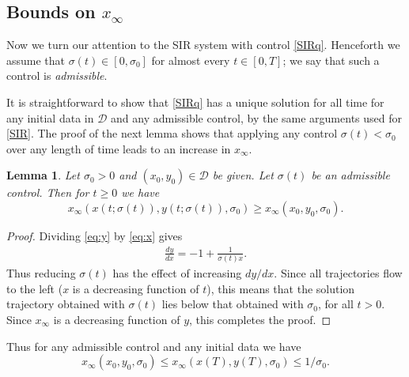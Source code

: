 \documentclass[english,12pt,letter]{article}
\newtheorem{lem}{Lemma}
\newtheorem{dfn}{Definition}
\newcommand{\Rnot}{\sigma_0}
\newcommand{\Sinf}{x_\infty}
\newcommand{\dom}{{\mathcal D}}
\begin{document}
\subsection{Bounds on $\Sinf$}
Now we turn our attention to the SIR system with control \eqref{SIRq}.
Henceforth we assume that $\sigma(t)\in[0,\sigma_0]$ for almost every $t\in[0,T]$;
we say that such a control is \emph{admissible}.


It is straightforward to show that \eqref{SIRq} has a unique solution for all time
for any initial data in $\dom$ and any admissible control, by the same
arguments used for \eqref{SIR}.
The proof of the next lemma shows that applying any control $\sigma(t)<\Rnot$ over
any length of time leads to an increase in $x_\infty$.
\begin{lem}
Let $\Rnot>0$ and $(x_0,y_0)\in\dom$ be given. %
Let $\sigma(t)$ be an admissible control.  Then for $t\ge0$ we have
$$
    x_\infty(x(t;\sigma(t)),y(t;\sigma(t)),\Rnot) \ge x_\infty(x_0,y_0,\Rnot).
$$
\end{lem}
\begin{proof}
    Dividing \eqref{eq:y} by \eqref{eq:x} gives
    \begin{align} \label{eq:dydx}
        \frac{dy}{dx} = -1 + \frac{1}{\sigma(t) x}.
    \end{align}
    Thus reducing $\sigma(t)$ has the effect of increasing $dy/dx$.
    Since all trajectories flow to the left ($x$ is a decreasing function of $t$),
    this means that the solution trajectory obtained with $\sigma(t)$ lies
    below that obtained with $\sigma_0$, for all $t>0$.  Since
    $\Sinf$ is a decreasing function of $y$, this completes the proof.
\end{proof}

Thus for any admissible control and any initial data we have
$$
\Sinf(x_0,y_0,\Rnot) \le \Sinf(x(T),y(T),\Rnot) \le 1/\Rnot.
$$
\end{document}
